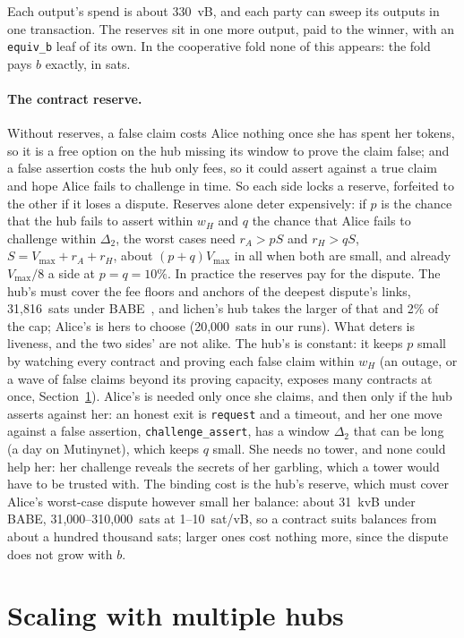 \documentclass[11pt]{article}
\newcommand{\vmax}{V_{\max}}
\newcommand{\tx}[1]{\texttt{#1}}
\begin{document}
Each output's spend is about 330~vB, and each party can sweep its
outputs in one transaction. The reserves sit in one more output, paid
to the winner, with an \tx{equiv\_b} leaf of its own. In the cooperative
fold none of this appears: the fold pays $b$ exactly, in sats.

\paragraph{The contract reserve.} Without reserves, a false claim costs
Alice nothing once she has spent her tokens, so it is a free option on
the hub missing its window to prove the claim false; and a false
assertion costs the hub only fees, so it could assert against a true
claim and hope Alice fails to challenge in time. So each side locks a
reserve, forfeited to the other if it loses a dispute. Reserves alone
deter expensively: if $p$ is the chance that the hub fails to assert
within $w_H$ and $q$ the chance that Alice fails to challenge within
$\Delta_2$, the worst cases need $r_A > pS$ and $r_H > qS$, $S = \vmax
+ r_A + r_H$, about $(p + q)\vmax$ in all when both are small, and
already $\vmax/8$ a side at $p = q = 10\%$. In practice the reserves
pay for the dispute. The hub's must cover the fee floors and anchors of
the deepest dispute's links, 31,816~sats under BABE~\cite{lichenl2},
and lichen's hub takes the larger of that and 2\% of the cap; Alice's
is hers to choose (20,000~sats in our runs). What deters is liveness,
and the two sides' are not alike. The hub's is constant: it keeps $p$
small by watching every contract and proving each false claim within
$w_H$ (an outage, or a wave of false claims beyond its proving
capacity, exposes many contracts at once, Section~\ref{sec:multihub}).
Alice's is needed only once she claims, and then only if the hub
asserts against her: an honest exit is \tx{request} and a timeout, and
her one move against a false assertion, \tx{challenge\_assert}, has a
window $\Delta_2$ that can be long (a day on Mutinynet), which keeps
$q$ small. She needs no tower, and none could help her: her challenge
reveals the secrets of her garbling, which a tower would have to be
trusted with. The binding cost is the hub's reserve, which must cover
Alice's worst-case dispute however small her balance: about 31~kvB
under BABE, 31,000--310,000~sats at 1--10~sat/vB, so a contract suits
balances from about a hundred thousand sats; larger ones cost nothing
more, since the dispute does not grow with $b$.

\section{Scaling with multiple hubs}
\label{sec:multihub}
\end{document}
